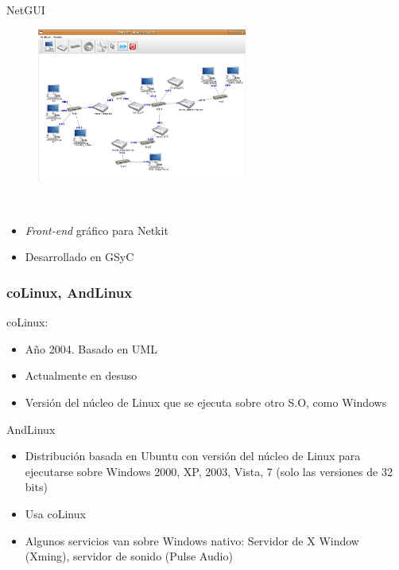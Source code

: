 \documentclass[ucs]{beamer}
\begin{document}
\begin{frame}[fragile]
NetGUI

\begin{minipage}{5cm}
\begin{figure}
\centerline{\includegraphics[width=6.9cm]{figs/netgui}}
\end{figure}
\end{minipage} \hfill
\
\begin{minipage}{4cm}
\begin{itemize} 
\item
\emph{Front-end} gráfico para Netkit
\item 
Desarrollado en GSyC
\end{itemize}
\end{minipage}\hfill
\end{frame}

\begin{frame}[fragile]

\frametitle{coLinux, AndLinux}

coLinux:
\begin{itemize}
\item
Año 2004. Basado en UML
\item
Actualmente en desuso
\item
Versión del núcleo de Linux que se ejecuta sobre otro S.O, como Windows
\end{itemize}

AndLinux
\begin{itemize}	
\item
Distribución basada en Ubuntu con
versión del núcleo de Linux para ejecutarse sobre Windows 2000, XP, 2003, Vista, 7 (solo las versiones de 32 bits)
\item
Usa coLinux
 
\item 
Algunos servicios van sobre Windows nativo: Servidor de X Window (Xming), servidor
de sonido (Pulse Audio)
\end{itemize}


\end{frame}
\end{document}
